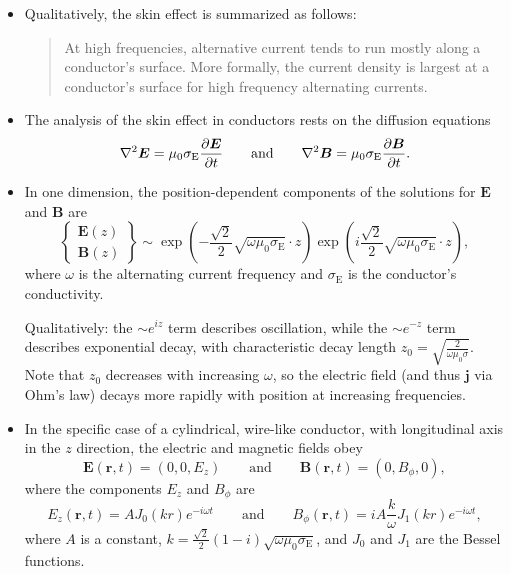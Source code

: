 \documentclass[11pt, a4paper]{article}
\newcommand{\eqtext}[1]{\qquad \text{#1} \qquad}
\renewcommand{\vec}[1]{\bm{#1}} %
\renewcommand{\r}{\vec{r}}
\newcommand{\E}{\vec{E}} %
\newcommand{\B}{\vec{B}} %
\newcommand{\mm}{\mu_{0}}  %
\renewcommand{\j}{\vec{j}}  %
\renewcommand{\laplacian}{\nabla^{2}}
\begin{document}
\begin{itemize}
	\item Qualitatively, the skin effect is summarized as follows:
    \begin{quote}
        At high frequencies, alternative current tends to run mostly along a conductor's surface. More formally, the current density is largest at a conductor's surface for high frequency alternating currents.
    \end{quote}

    \item The analysis of the skin effect in conductors rests on the diffusion equations
    \begin{equation*}
		\laplacian \E = \mm \sigma_{\text{E}}\pdv{\E}{t} \eqtext{and} \laplacian \B = \mm \sigma_{\text{E}} \pdv{\B}{t}.
    \end{equation*}
    
	\item In one dimension, the position-dependent components of the solutions for $ \E $ and $ \B $ are
	\begin{equation*}
		\begin{Bmatrix}
            \E(z)\\
            \B(z)
		\end{Bmatrix}
        \sim \exp\left(- \frac{\sqrt{2}}{2}\sqrt{\omega \mm \sigma_{\text{E}}}\cdot z\right)\exp\left(i \frac{\sqrt{2}}{2}\sqrt{\omega \mm \sigma_{\text{E}}}\cdot z\right),
	\end{equation*}
    where $ \omega $ is the alternating current frequency and $ \sigma_{\text{E}} $ is the conductor's conductivity. 

	Qualitatively: the $ \sim e^{iz} $ term describes oscillation, while the $ \sim e^{-z} $ term describes exponential decay, with characteristic decay length $ z_{0} = \sqrt{\frac{2}{\omega \mm \sigma}} $. Note that $ z_{0} $ decreases with increasing $ \omega $, so the electric field (and thus $ \j $ via Ohm's law) decays more rapidly with position at increasing frequencies. 


    \item In the specific case of a cylindrical, wire-like conductor, with longitudinal axis in the $ z $ direction, the electric and magnetic fields obey
    \begin{equation*}
        \E(\r, t) = (0, 0, E_{z}) \qquad \text{and} \qquad \B(\r, t) = (0, B_{\phi}, 0),
    \end{equation*}
    where the components $ E_{z} $ and $ B_{\phi} $ are
	\begin{equation*}
        E_{z}(\r, t) = A J_{0}(kr)e^{-i \omega t} \eqtext{and} B_{\phi}(\r, t) = i A \frac{k}{\omega} J_{1}(kr)e^{-i \omega t},
	\end{equation*}
	where $ A $ is a constant, $ k = \frac{\sqrt{2}}{2}(1- i)\sqrt{\omega \mm \sigma_{\text{E}}} $,	and $ J_{0} $ and $ J_{1} $ are the Bessel functions.
    

\end{itemize}
\end{document}
